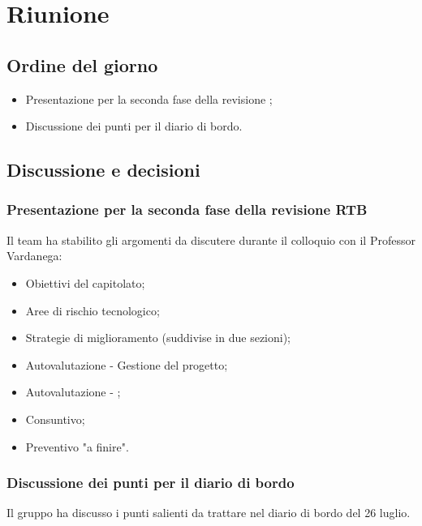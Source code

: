 \section{Riunione}
\subsection{Ordine del giorno}
\begin{itemize}
	\item Presentazione per la seconda fase della revisione ;
	\item Discussione dei punti per il diario di bordo.
\end{itemize}

\subsection{Discussione e decisioni}
\subsubsection{Presentazione per la seconda fase della revisione RTB}
\par Il team ha stabilito gli argomenti da discutere durante il colloquio con il Professor Vardanega:
\begin{itemize}
	\item Obiettivi del capitolato;
	\item Aree di rischio tecnologico;
	\item Strategie di miglioramento (suddivise in due sezioni);
	\item Autovalutazione - Gestione del progetto;
	\item Autovalutazione - ;
	\item Consuntivo;
	\item Preventivo "a finire".
\end{itemize}

\subsubsection{Discussione dei punti per il diario di bordo}
\par Il gruppo ha discusso i punti salienti da trattare nel diario di bordo del 26 luglio.
